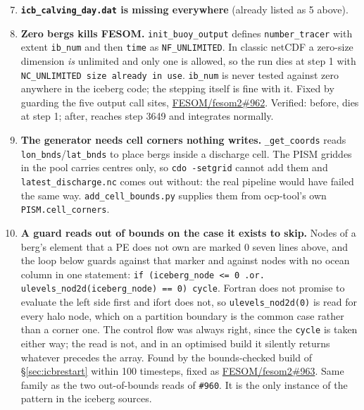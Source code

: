 \documentclass[11pt,a4paper]{article}
\newcommand{\code}[1]{\texttt{\small #1}}
\begin{document}
\begin{enumerate}
\setcounter{enumi}{6}
\item \textbf{\code{icb\_calving\_day.dat} is missing everywhere} (already listed as 5 above).
\item \textbf{Zero bergs kills FESOM.} \code{init\_buoy\_output} defines
      \code{number\_tracer} with extent \code{ib\_num} and then \code{time} as
      \code{NF\_UNLIMITED}. In classic netCDF a zero-size dimension \emph{is} unlimited and only
      one is allowed, so the run dies at step 1 with \code{NC\_UNLIMITED size already in use}.
      \code{ib\_num} is never tested against zero anywhere in the iceberg code; the stepping
      itself is fine with it. Fixed by guarding the five output call sites,
      \href{https://github.com/FESOM/fesom2/pull/962}{FESOM/fesom2\#962}. Verified: before, dies
      at step 1; after, reaches step 3649 and integrates normally.
\item \textbf{The generator needs cell corners nothing writes.} \code{\_get\_coords} reads
      \code{lon\_bnds}/\code{lat\_bnds} to place bergs inside a discharge cell. The PISM griddes
      in the pool carries centres only, so \code{cdo -setgrid} cannot add them and
      \code{latest\_discharge.nc} comes out without: the real pipeline would have failed the same
      way. \code{add\_cell\_bounds.py} supplies them from ocp-tool's own
      \code{PISM.cell\_corners}.
\item \textbf{A guard reads out of bounds on the case it exists to skip.} Nodes of a berg's
      element that a PE does not own are marked 0 seven lines above, and the loop below guards
      against that marker and against nodes with no ocean column in one statement:
      \code{if (iceberg\_node <= 0 .or. ulevels\_nod2d(iceberg\_node) == 0) cycle}. Fortran does
      not promise to evaluate the left side first and ifort does not, so
      \code{ulevels\_nod2d(0)} is read for every halo node, which on a partition boundary is the
      common case rather than a corner one. The control flow was always right, since the
      \code{cycle} is taken either way; the read is not, and in an optimised build it silently
      returns whatever precedes the array. Found by the bounds-checked build of
      \S\ref{sec:icbrestart} within 100 timesteps, fixed as
      \href{https://github.com/FESOM/fesom2/pull/963}{FESOM/fesom2\#963}. Same family as the two
      out-of-bounds reads of \code{\#960}. It is the only instance of the pattern in the iceberg
      sources.
\end{enumerate}
\end{document}
